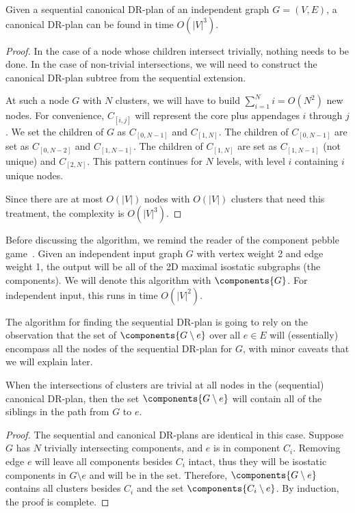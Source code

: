 \begin{observation}\label{obs:seq-to-reg-canonical}
    Given a sequential canonical DR-plan of an independent graph $G=(V,E)$, a canonical DR-plan can be found in time $O(|V|^3)$.
\end{observation}

\begin{proof}
    In the case of a node whose children intersect trivially, nothing needs to be done.
    In the case of non-trivial intersections, we will need to construct the canonical DR-plan subtree from the sequential extension.

    At such a node $G$ with $N$ clusters, we will have to build $\sum_{i=1}^N{i}=O(N^2)$ new nodes. For convenience, $C_{[i,j]}$ will represent the core plus appendages $i$ through $j$. We set the children of $G$ as $C_{[0,N-1]}$ and $C_{[1,N]}$. The children of $C_{[0,N-1]}$ are set as $C_{[0,N-2]}$ and $C_{[1,N-1]}$. The children of $C_{[1,N]}$ are set as $C_{[1,N-1]}$ (not unique) and $C_{[2,N]}$. This pattern continues for $N$ levels, with level $i$ containing $i$ unique nodes.

    Since there are at most $O(|V|)$ nodes with $O(|V|)$ clusters that need this treatment, the complexity is $O(|V|^3)$.
\end{proof}


Before discussing the algorithm, we remind the reader of the component pebble game~\cite{Jacobs:1997:PG}. Given an independent input graph $G$ with vertex weight 2 and edge weight 1, the output will be all of the 2D maximal isostatic subgraphs (the components). We will denote this algorithm with $\components{G}$. For independent input, this runs in time $O(|V|^2)$.

The algorithm for finding the sequential DR-plan is going to rely on the observation that the set of $\components{G\setminus e}$ over all $e\in E$ will (essentially) encompass all the nodes of the sequential DR-plan for $G$, with minor caveats that we will explain later.

\begin{lemma}\label{lemma:seq-nontriv-Gtoe}
    When the intersections of clusters are trivial at all nodes in the (sequential) canonical DR-plan, then the set $\components{G\setminus e}$ will contain all of the siblings in the path from $G$ to $e$.
\end{lemma}

\begin{proof}
    The sequential and canonical DR-plans are identical in this case. Suppose $G$ has $N$ trivially intersecting components, and $e$ is in component $C_i$. Removing edge $e$ will leave all components besides $C_i$ intact, thus they will be isostatic components in $G\setminus e$ and will be in the set. Therefore, $\components{G\setminus e}$ contains
    all clusters besides $C_i$
    and the set $\components{C_i\setminus e}$. By induction, the proof is complete.
\end{proof}

